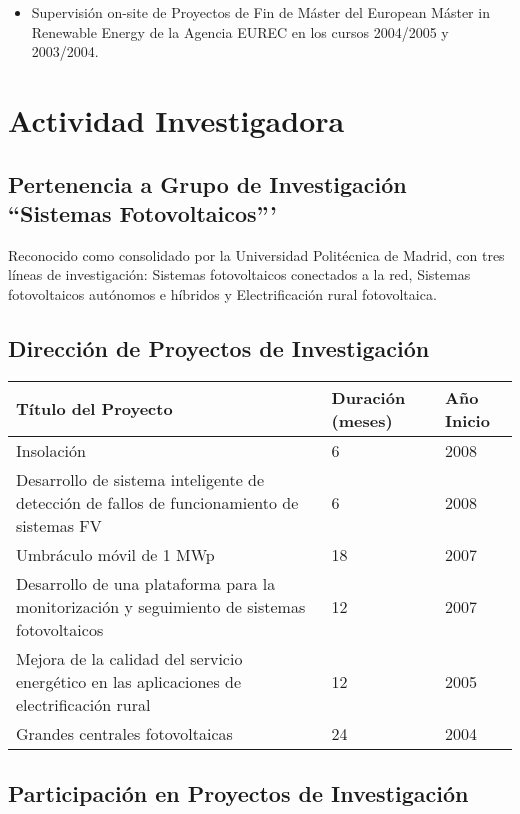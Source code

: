 \documentclass[article, a4paper]{memoir}
\begin{document}
\begin{itemize}
\item Supervisión on-site de Proyectos de Fin de Máster del European
Máster in Renewable Energy de la Agencia EUREC en los cursos
2004/2005 y 2003/2004.
\end{itemize}


\section{Actividad Investigadora}
\label{sec-4}

\subsection{Pertenencia a Grupo de Investigación ``Sistemas Fotovoltaicos'''}
\label{sec-4-1}

Reconocido como consolidado por la Universidad Politécnica de
Madrid, con tres líneas de investigación: Sistemas fotovoltaicos
conectados a la red, Sistemas fotovoltaicos autónomos e híbridos y
Electrificación rural fotovoltaica.


\subsection{Dirección de Proyectos de Investigación}
\label{sec-4-2}
\begin{center}
\begin{tabular}{p{110mm}|p{17mm}|p{25mm}}
Título del Proyecto & Duración (meses) & Año Inicio\\
\hline
Insolación & 6 & 2008\\
Desarrollo de sistema inteligente de detección de fallos de funcionamiento de sistemas FV & 6 & 2008\\
Umbráculo móvil de 1 MWp & 18 & 2007\\
Desarrollo de una plataforma para la monitorización y seguimiento de sistemas fotovoltaicos & 12 & 2007\\
Mejora de la calidad del servicio energético en las aplicaciones de electrificación rural & 12 & 2005\\
Grandes centrales fotovoltaicas & 24 & 2004\\
\end{tabular}
\end{center}


\subsection{Participación en Proyectos de Investigación}
\label{sec-4-3}
\end{document}
